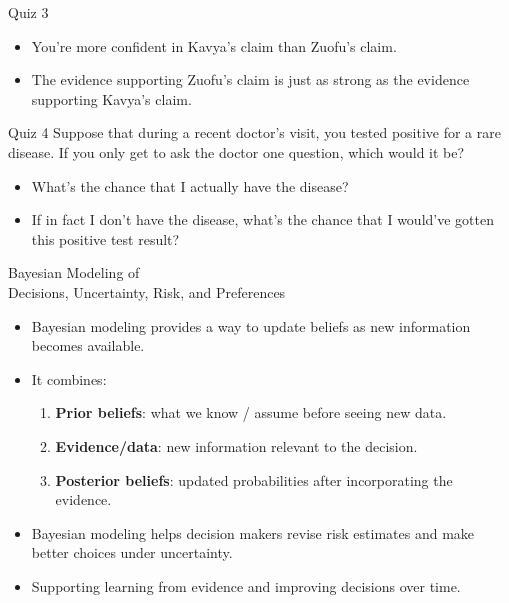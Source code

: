 \documentclass[12pt]{beamer}
\newcommand{\vocab}[1]{\textcolor{AggieMaroon}{\textbf{#1}}}
\begin{document}
{\begin{frame}{}
\begin{block}{Quiz 3}
\begin{itemize}
\item[a.] You’re more confident in Kavya’s claim than Zuofu’s claim.
\item[b.] The evidence supporting Zuofu’s claim is just as strong as the evidence supporting Kavya’s claim.
\end{itemize}
\end{block}
\end{frame}

\begin{frame}{}
\begin{block}{Quiz 4}
Suppose that during a recent doctor’s visit, you tested positive for a rare disease. If you only get to ask the doctor one question, which would it be?
\begin{itemize}
\item[a.] What’s the chance that I actually have the disease?
\item[b.] If in fact I don’t have the disease, what’s the chance that I would’ve gotten this positive test result?
\end{itemize}
\end{block}
\end{frame}
}

\begin{frame}{}
\begin{block}{Bayesian Modeling of\\Decisions, Uncertainty, Risk, and Preferences}
\begin{itemize}
\item Bayesian modeling provides a way to update beliefs as new information becomes available.
\item It combines:
\begin{enumerate}
\item \vocab{Prior beliefs}: what we know / assume before seeing new data.
\item \vocab{Evidence/data}: new information relevant to the decision.
\item \vocab{Posterior beliefs}: updated probabilities after incorporating the evidence.
\end{enumerate}
\item Bayesian modeling helps decision makers revise risk estimates and make better choices under uncertainty.
\item Supporting learning from evidence and improving decisions over time.
\end{itemize}
\end{block}
\end{frame}
\end{document}
